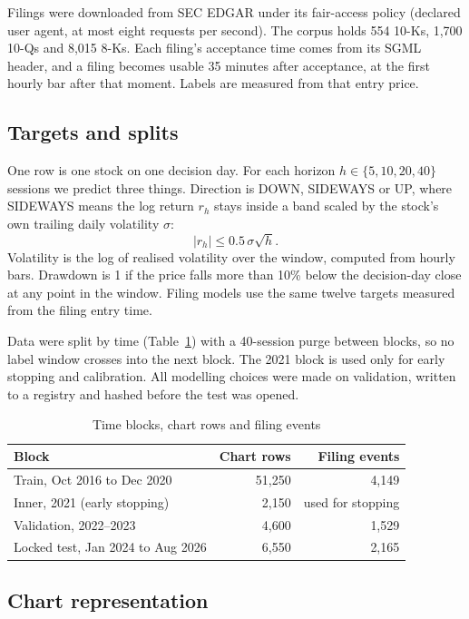 \documentclass[conference]{IEEEtran}
\begin{document}
Filings were downloaded from SEC EDGAR under its fair-access policy (declared user agent, at most eight requests per second). The corpus holds 554 10-Ks, 1,700 10-Qs and 8,015 8-Ks. Each filing's acceptance time comes from its SGML header, and a filing becomes usable 35 minutes after acceptance, at the first hourly bar after that moment. Labels are measured from that entry price.

\subsection{Targets and splits}

One row is one stock on one decision day. For each horizon $h \in \{5,10,20,40\}$ sessions we predict three things. Direction is DOWN, SIDEWAYS or UP, where SIDEWAYS means the log return $r_h$ stays inside a band scaled by the stock's own trailing daily volatility $\sigma$:
\begin{equation}
|r_h| \le 0.5\,\sigma\sqrt{h}.
\end{equation}
Volatility is the log of realised volatility over the window, computed from hourly bars. Drawdown is 1 if the price falls more than 10\% below the decision-day close at any point in the window. Filing models use the same twelve targets measured from the filing entry time.

Data were split by time (Table~\ref{tab:split}) with a 40-session purge between blocks, so no label window crosses into the next block. The 2021 block is used only for early stopping and calibration. All modelling choices were made on validation, written to a registry and hashed before the test was opened.

\begin{table}[t]
\caption{Time blocks, chart rows and filing events}
\label{tab:split}
\centering
\begin{tabular}{lrr}
\toprule
Block & Chart rows & Filing events \\
\midrule
Train, Oct 2016 to Dec 2020 & 51,250 & 4,149 \\
Inner, 2021 (early stopping) & 2,150 & used for stopping \\
Validation, 2022--2023 & 4,600 & 1,529 \\
Locked test, Jan 2024 to Aug 2026 & 6,550 & 2,165 \\
\bottomrule
\end{tabular}
\end{table}

\subsection{Chart representation}
\end{document}
